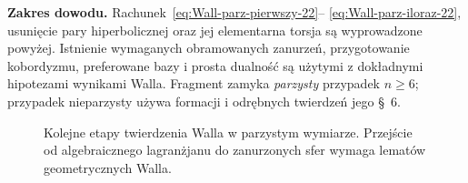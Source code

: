 \noindent\textbf{Zakres dowodu.}
Rachunek~\eqref{eq:Wall-parz-pierwszy-22}--
\eqref{eq:Wall-parz-iloraz-22}, usunięcie pary
hiperbolicznej oraz jej elementarna torsja są
wyprowadzone powyżej. Istnienie wymaganych
obramowanych zanurzeń, przygotowanie kobordyzmu,
preferowane bazy i prosta dualność są użytymi
z dokładnymi hipotezami wynikami Walla.
Fragment zamyka \emph{parzysty} przypadek $n\geq6$;
przypadek nieparzysty używa formacji i odrębnych
twierdzeń jego §~6.

\begin{figure}[htbp]
\centering
{}
\caption{Kolejne etapy twierdzenia Walla w parzystym wymiarze.
Przejście od algebraicznego lagranżjanu do zanurzonych
sfer wymaga lematów geometrycznych Walla.}
\label{fig:mechanizm-Wall-22}
\end{figure}

